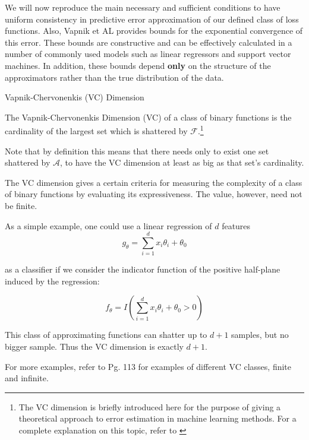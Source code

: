 We will now reproduce the main necessary and sufficient conditions to have uniform consistency in predictive error approximation of our defined class of loss functions. Also,
Vapnik et AL provides bounds for the exponential convergence of this error. These bounds are constructive and can be effectively calculated in a number of commonly used models such as linear regressors and support vector machines. In addition, these bounds depend \textbf{only} on the structure of the approximators rather than the true distribution of the data.


\begin{definition}{Vapnik-Chervonenkis (VC) Dimension}

The Vapnik-Chervonenkis Dimension (VC) of a class of binary functions is the cardinality of the largest set which is shattered by $\mathcal {F}$.\footnote{The VC dimension is briefly introduced here for the purpose of giving a theoretical approach to error estimation in machine learning methods. For a complete explanation on this topic, refer to \textcite{vapnik-nature2013}}
\end{definition}


Note that by definition this means that there needs only to exist one set shattered by $\mathcal {A}$, to have the VC dimension at least as big as that set's cardinality.


The VC dimension gives a certain criteria for measuring the complexity of a class of binary functions by evaluating its expressiveness. The value, however, need not be finite.

As a simple example, one could use a linear regression of $d$ features
\begin{equation}
g_{\theta} = \sum_{i=1}^d x_i \theta_i + \theta_0
\end{equation}

 as a classifier if we consider the indicator function of the positive half-plane induced by the regression:

\begin{equation}
f_{\theta} = I(\sum_{i=1}^d x_i \theta_i + \theta_0 > 0)
\end{equation}

This class of approximating functions can shatter up to $d+1$ samples, but no bigger sample. Thus the VC dimension is exactly $d+1$.

For more examples, refer to \textcite{cherkassky-learning2007} Pg. 113 for examples of different VC classes, finite and infinite.

